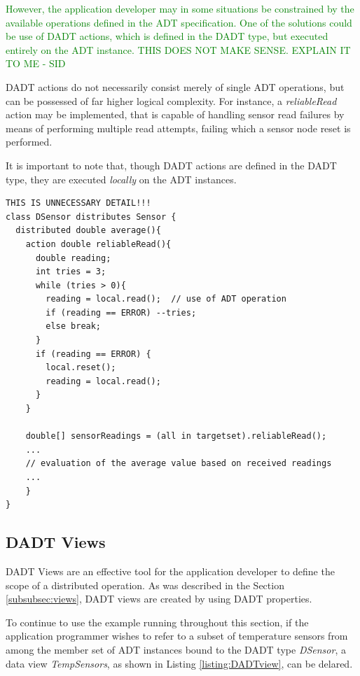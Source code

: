 \textcolor{green}{However, the application developer may in some situations be constrained by the available
operations defined in the ADT specification. One of the solutions could be use of
DADT actions, which is defined in the DADT type, but executed entirely on the
ADT instance. THIS DOES NOT MAKE SENSE. EXPLAIN IT TO ME - SID}

DADT actions do not necessarily consist merely of single ADT operations, but can
be possessed of far higher logical complexity. For instance, a
\emph{reliableRead} action may be implemented, that is capable of handling
sensor read failures by means of performing multiple read attempts, failing which
a sensor node reset is performed.

It is important to note that, though DADT actions are defined in the DADT type, they are executed \emph{locally} on the ADT
instances.
 
\begin{lstlisting}[frame=trbl, basewidth={0.55em, 0.6em}, captionpos=b, 
basicstyle=\ttfamily\footnotesize, breaklines, caption = Use of DADT Action (reproduced from \cite{migliavacca_DADT:2006}), label = listing:DADTAction ]  
THIS IS UNNECESSARY DETAIL!!!
class DSensor distributes Sensor {
  distributed double average(){
    action double reliableRead(){
      double reading;
      int tries = 3;
      while (tries > 0){
        reading = local.read();  // use of ADT operation
        if (reading == ERROR) --tries;
        else break; 
      }
      if (reading == ERROR) {
        local.reset();
        reading = local.read();
      }
    }

    double[] sensorReadings = (all in targetset).reliableRead();
    ...
    // evaluation of the average value based on received readings	
    ...
    }
}
\end{lstlisting}

\subsection{DADT Views} \label{subsubsec:viewsImpl}

DADT Views are an effective tool for the application developer to
define the scope of a distributed operation. As was described in the Section
\ref{subsubsec:views}, DADT views are created by using DADT properties.

To continue to use the example running throughout this section, if the application programmer wishes to refer to a subset of temperature sensors from among the member set of ADT instances bound to the DADT type \emph{DSensor}, a data view \emph{TempSensors}, 
as shown in Listing \ref{listing:DADTview}, can be delared.
  
